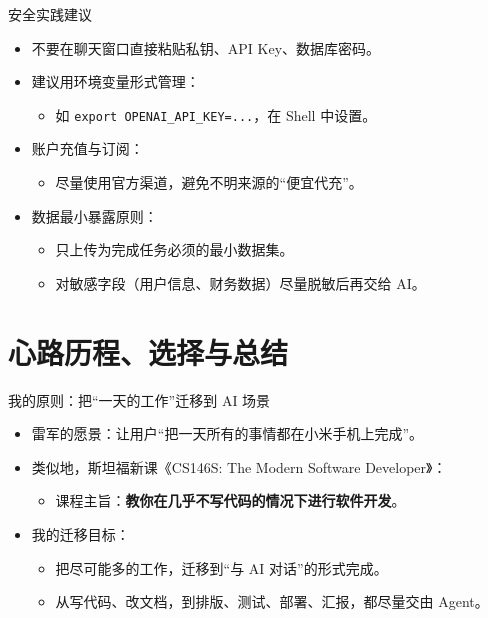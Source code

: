 \documentclass[10pt,aspectratio=169]{beamer}
\begin{document}
\begin{frame}[fragile]{安全实践建议}
  \begin{itemize}
    \item 不要在聊天窗口直接粘贴私钥、API Key、数据库密码。
    \item 建议用环境变量形式管理：
      \begin{itemize}
        \item 如 \verb|export OPENAI_API_KEY=...|，在 Shell 中设置。
      \end{itemize}
    \item 账户充值与订阅：
      \begin{itemize}
        \item 尽量使用官方渠道，避免不明来源的“便宜代充”。
      \end{itemize}
    \item 数据最小暴露原则：
      \begin{itemize}
        \item 只上传为完成任务必须的最小数据集。
        \item 对敏感字段（用户信息、财务数据）尽量脱敏后再交给 AI。
      \end{itemize}
  \end{itemize}
\end{frame}

\section{心路历程、选择与总结}

\begin{frame}{我的原则：把“一天的工作”迁移到 AI 场景}
  \begin{itemize}
    \item 雷军的愿景：让用户“把一天所有的事情都在小米手机上完成”。
    \item 类似地，斯坦福新课《CS146S: The Modern Software Developer》：
      \begin{itemize}
        \item 课程主旨：\textbf{教你在几乎不写代码的情况下进行软件开发}。
      \end{itemize}
    \item 我的迁移目标：
      \begin{itemize}
        \item 把尽可能多的工作，迁移到“与 AI 对话”的形式完成。
        \item 从写代码、改文档，到排版、测试、部署、汇报，都尽量交由 Agent。
      \end{itemize}
  \end{itemize}
\end{frame}
\end{document}
